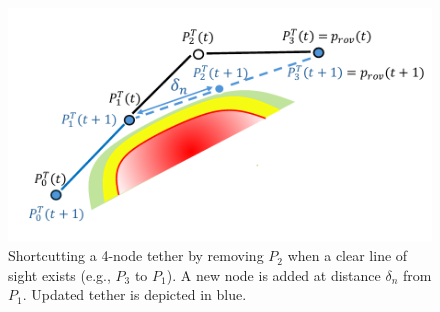 %
\begin{figure}[t!]
	\centering	\includegraphics[width=1\linewidth]{EA-Planner/figures/tether_shortcut.pdf}
\caption{Shortcutting a 4-node tether by removing $P_2$ when a clear line of sight exists (e.g., $P_3$ to $P_1$). A new node is added at distance $\delta_n$ from $P_1$. Updated tether is depicted in blue.}
    \label{fig:tether}
\end{figure}
%














